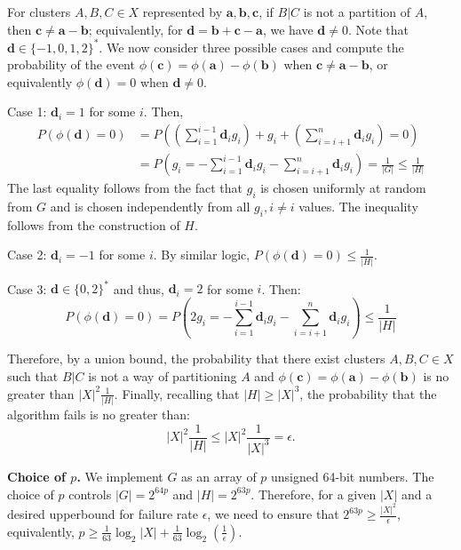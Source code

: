 \documentclass[12pt]{article}
\begin{document}
For clusters $A, B, C \in X$ represented by $\mathbf{a}, \mathbf{b}, \mathbf{c}$, if $B|C$ is not a partition of $A$, then $\mathbf{c} \neq \mathbf{a} - \mathbf{b}$; equivalently, for $\mathbf{d} = \mathbf{b} + \mathbf{c} - \mathbf{a}$, we have $\mathbf{d} \neq 0$. Note that $\mathbf{d} \in \{-1, 0, 1, 2\}^*$. We now consider three possible cases and compute the probability of the event $\phi(\mathbf{c}) = \phi(\mathbf{a}) - \phi(\mathbf{b})$ when $\mathbf{c} \neq \mathbf{a} - \mathbf{b}$, or equivalently $\phi(\mathbf{d}) = 0$ when $\mathbf{d} \neq 0$.

Case 1: $\mathbf{d}_i = 1$ for some $i$. Then,
\begin{align*}
P(\phi(\mathbf{d}) = 0) &= P\left( \left( \sum_{i=1}^{i-1} \mathbf{d}_i g_i \right) + g_i + \left( \sum_{i=i+1}^n \mathbf{d}_i g_i \right) = 0 \right) \\
&= P\left( g_i = -\sum_{i=1}^{i-1} \mathbf{d}_i g_i - \sum_{i=i+1}^n \mathbf{d}_i g_i \right) = \frac{1}{|G|} \leq \frac{1}{|H|}
\end{align*}
The last equality follows from the fact that $g_i$ is chosen uniformly at random from $G$ and is chosen independently from all $g_i, i \neq i$ values. The inequality follows from the construction of $H$.

Case 2: $\mathbf{d}_i = -1$ for some $i$. By similar logic, $P(\phi(\mathbf{d}) = 0) \leq \frac{1}{|H|}$.

Case 3: $\mathbf{d} \in \{0, 2\}^*$ and thus, $\mathbf{d}_i = 2$ for some $i$. Then:
\[
P(\phi(\mathbf{d}) = 0) = P\left( 2 g_i = -\sum_{i=1}^{i-1} \mathbf{d}_i g_i - \sum_{i=i+1}^n \mathbf{d}_i g_i \right) \leq \frac{1}{|H|}
\]

Therefore, by a union bound, the probability that there exist clusters $A, B, C \in X$ such that $B|C$ is not a way of partitioning $A$ and $\phi(\mathbf{c}) = \phi(\mathbf{a}) - \phi(\mathbf{b})$ is no greater than $|X|^2 \frac{1}{|H|}$. Finally, recalling that $|H| \geq |X|^3$, the probability that the algorithm fails is no greater than:
\[
|X|^2 \frac{1}{|H|} \leq |X|^2 \frac{1}{|X|^3} = \epsilon .
\]

\textbf{Choice of $p$.} We implement $G$ as an array of $p$ unsigned 64-bit numbers. The choice of $p$ controls $|G| = 2^{64p}$ and $|H| = 2^{63p}$. Therefore, for a given $|X|$ and a desired upperbound for failure rate $\epsilon$, we need to ensure that $2^{63p} \geq \frac{|X|^2}{\epsilon}$, equivalently, $p \geq \frac{1}{63} \log_2 |X| + \frac{1}{63} \log_2 \left( \frac{1}{\epsilon} \right)$.
\end{document}
